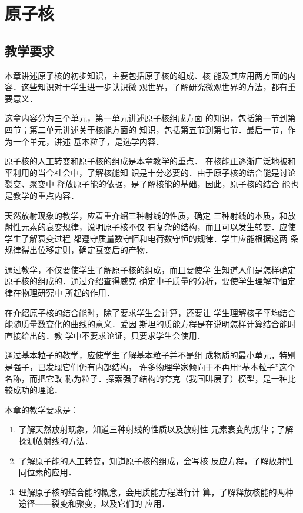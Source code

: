 \chapter{原子核}
\minitoc[n]

\section{教学要求}

本章讲述原子核的初步知识，主要包括原子核的组成、核
能及其应用两方面的内容．这些知识对于学生进一步认识微
观世界，了解研究微观世界的方法，都有重要意义．

这章内容分为三个单元，第一单元讲述原子核组成方面
的知识，包括第一节到第四节；第二单元讲述关于核能方面的
知识，包括第五节到第七节．最后一节，作为一个单元，讲述
基本粒子，是选学内容．

原子核的人工转变和原子核的组成是本章教学的重点．
在核能正逐渐广泛地被和平利用的当今社会中，了解核能知
识是十分必要的．由于原子核的结合能是讨论裂变、聚变中
释放原子能的依据，是了解核能的基础，因此，原子核的结合
能也是教学的重点内容．

天然放射现象的教学，应着重介绍三种射线的性质，确定
三种射线的本质，和放射性元素的衰变规律，说明原子核不仅
有复杂的结构，而且可以发生转变．应使学生了解衰变过程
都遵守质量数守恒和电荷数守恒的规律．学生应能根据这两
条规律得出位移定则，确定衰变后的产物．

通过教学，不仅要使学生了解原子核的组成，而且要使学
生知道人们是怎样确定原子核的组成的．通过介绍查得威克
确定中子质量的分析，要使学生理解守恒定律在物理研究中
所起的作用．

在介绍原子核的结合能时，除了要求学生会计算，还要让
学生理解核子平均结合能随质量数变化的曲线的意义．爱因
斯坦的质能方程是在说明怎样计算结合能时直接给出的．教
学中不要求论证，只要求学生会使用．

通过基本粒子的教学，应使学生了解基本粒子并不是组
成物质的最小单元，特别是强子，已发现它们仍有内部结构，
许多物理学家倾向于不再用“基本粒子”这个名称，而把它改
称为粒子．探索强子结构的夸克（我国叫层子）模型，是一种比
较成功的理论．


本章的教学要求是：
\begin{enumerate}
\item 了解天然放射现象，知道三种射线的性质以及放射性
元素衰变的规律；了解探测放射线的方法．
\item 了解原子能的人工转变，知道原子核的组成，会写核
反应方程，了解放射性同位素的应用．
\item 理解原子核的结合能的概念，会用质能方程进行计
算，了解释放核能的两种途径——裂变和聚变，以及它们的
应用．
\end{enumerate}

